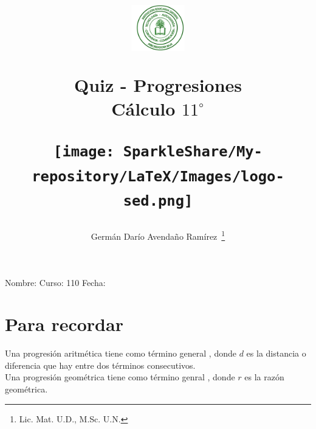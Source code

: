 \documentclass[11pt]{article}
\author{Germ\'an Dar\'io Avenda\~no Ram\'irez~\thanks{Lic. Mat. U.D., M.Sc. U.N.}}
\title{\begin{minipage}{0.15\textwidth}\includegraphics[height=2cm]{Images/logo-colegio.png}
\end{minipage}\hfill \begin{minipage}{0.7\textwidth}\begin{center}
Quiz - Progresiones\\Cálculo $11^{\circ}$\end{center}
\end{minipage}\hfill
\begin{minipage}{0.15\textwidth}
\texttt{[image: SparkleShare/My-repository/LaTeX/Images/logo-sed.png]} 
\end{minipage}}
\date{}
\begin{document}
\maketitle
Nombre: \hrulefill Curso: 110\underline{\hspace{12pt}}  Fecha: \underline{\hspace{2cm}}
\section*{Para recordar}
Una progresi\'on aritmética tiene como término general , donde $d$ es la distancia o diferencia que hay entre dos términos consecutivos.\\

Una progresión geométrica tiene como término genral ,
donde $r$ es la razón geométrica.
\end{document}
